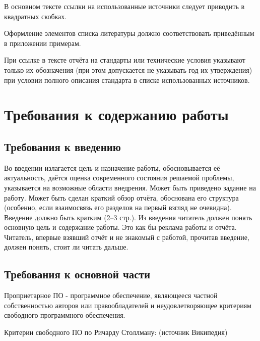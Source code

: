\documentclass[utf8,12pt, coursreport]{G7-32}
\begin{document}
В основном тексте ссылки на использованные источники следует приводить в квадратных скобках.

Оформление элементов списка литературы должно соответствовать приведённым в приложении примерам.

При ссылке в тексте отчёта на стандарты или технические условия указывают только их обозначения (при этом допускается не указывать год их утверждения) при условии полного описания стандарта в списке использованных источников.




\chapter{Требования к содержанию работы}

\section{Требования к введению}

Во введении излагается цель и назначение работы, обосновывается её актуальность, даётся оценка современного состояния решаемой проблемы, указывается на возможные области внедрения. Может быть приведено задание на работу. Может быть сделан краткий обзор отчёта, обоснована его структура (особенно, если взаимосвязь его разделов на первый взгляд не очевидна). Введение должно быть кратким (2--3 стр.). Из введения читатель должен понять основную цель и содержание работы. Это как бы реклама работы и отчёта. Читатель, впервые взявший отчёт и не знакомый с работой, прочитав введение, должен понять, стоит ли читать дальше.

\section{Требования к основной части}

Проприетарное ПО - программное обеспечение, являющееся частной собственностью авторов или правообладателей и неудовлетворяющее критериям свободного программного обеспечения.

Критерии свободного ПО по Ричарду Столлману: (источник Википедия)
\end{document}
